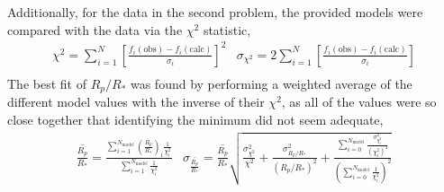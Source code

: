 \documentclass[10pt, preprint]{aastex}
\begin{document}
Additionally, for the data in the second problem, the provided models were compared with the data via the $\chi^2$ statistic,
\begin{equation} 
\begin{array}{cc}
\chi^2 = \sum_{i=1}^N\left[\frac{f_i(\text{obs})-f_i(\text{calc})}{\sigma_i}\right]^2 &
\sigma_{\chi^2} = 2\sum_{i=1}^N\left[\frac{f_i(\text{obs})-f_i(\text{calc})}{\sigma_i}\right]\\
\end{array}
\end{equation}
The best fit of $R_p/R_*$ was found by performing a weighted average of the different model values with the inverse of their $\chi^2$, as all of the values were so close together that identifying the minimum did not seem adequate,
\begin{equation}
\begin{array}{ll}
\overline{\frac{R_p}{R_*}} = \frac{\sum_{i=1}^{N_\text{model}}\left(\frac{R_p}{R_*}\right)_i\frac{1}{\chi_i^2}}{\sum_{i=1}^{N_\text{model}}\frac{1}{\chi_i^2}} &

\sigma_{\overline{\frac{R_p}{R_*}}} = \overline{\frac{R_p}{R_*}}\sqrt{
\frac{\sigma_{\chi^2}^2}{\chi^2}+\frac{\sigma_{R_p/R_*}^2}{(R_p/R_*)^2}
+\frac{\sum_{i=0}^{N_\text{model}} \frac{\sigma_{\chi^2_i}^2}{(\chi^2_i)^4}}
{\left(\sum_{i=0}^{N_\text{model}}\frac{1}{\chi^2_i}\right)^2}}\\
\end{array}
\end{equation}
\vspace{-20pt}
\end{document}
